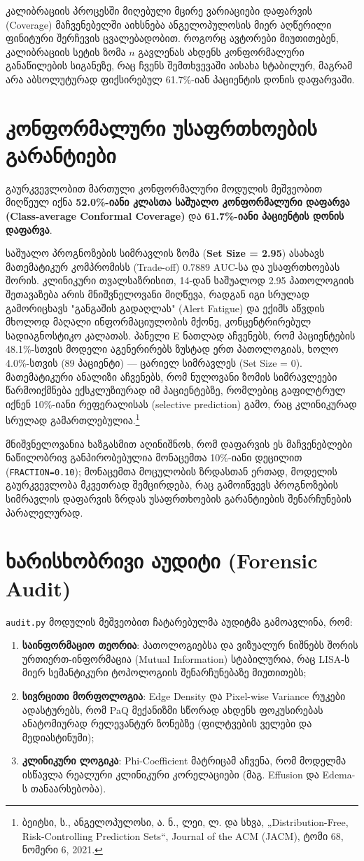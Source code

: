 \documentclass[12pt,a4paper,oneside]{report}
\begin{document}
კალიბრაციის პროცესში მიღებული მცირე ვარიაციები დაფარვის (Coverage) მაჩვენებელში აიხსნება ანგელოპულოსის მიერ აღწერილი ფინიტური შერჩევის ცვალებადობით. როგორც ავტორები მიუთითებენ, კალიბრაციის სეტის ზომა $n$ გავლენას ახდენს კონფორმალური განაწილების სიგანეზე, რაც ჩვენს შემთხვევაში აისახა სტაბილურ, მაგრამ არა აბსოლუტურად ფიქსირებულ 61.7\%-იან პაციენტის დონის დაფარვაში.

\section{კონფორმალური უსაფრთხოების გარანტიები}
გაურკვევლობით მართული კონფორმალური მოდულის მეშვეობით მიღწეულ იქნა \textbf{52.0\%-იანი კლასთა საშუალო კონფორმალური დაფარვა (Class-average Conformal Coverage)} და \textbf{61.7\%-იანი პაციენტის დონის დაფარვა}. 

საშუალო პროგნოზების სიმრავლის ზომა (\textbf{Set Size = 2.95}) ასახავს მათემატიკურ კომპრომისს (Trade-off) 0.7889 AUC-სა და უსაფრთხოებას შორის. კლინიკური თვალსაზრისით, 14-დან საშუალოდ 2.95 პათოლოგიის შეთავაზება არის მნიშვნელოვანი მიღწევა, რადგან იგი სრულად გამორიცხავს "განგაშის გადაღლას" (Alert Fatigue) და ექიმს აწვდის მხოლოდ მაღალი ინფორმაციულობის მქონე, კონცენტრირებულ სადიაგნოსტიკო კალათას. პანელი E ნათლად აჩვენებს, რომ პაციენტების 48.1\%-სთვის მოდელი აგენერირებს ზუსტად ერთ პათოლოგიას, ხოლო 4.0\%-სთვის (89 პაციენტი) — ცარიელ სიმრავლეს (Set Size = 0). მათემატიკური ანალიზი აჩვენებს, რომ ნულოვანი ზომის სიმრავლეები წარმოიქმნება ექსკლუზიურად იმ პაციენტებზე, რომლებიც გაფილტრულ იქნენ 10\%-იანი რეფერალისას (selective prediction) გამო, რაც კლინიკურად სრულად გამართლებულია.\footnote{ბეიტსი, ს., ანგელოპულოსი, ა. ნ., ლეი, ლ. და სხვა, „Distribution-Free, Risk-Controlling Prediction Sets“, Journal of the ACM (JACM), ტომი 68, ნომერი 6, 2021.}

მნიშვნელოვანია ხაზგასმით აღინიშნოს, რომ დაფარვის ეს მაჩვენებლები ნაწილობრივ განპირობებულია მონაცემთა 10\%-იანი დეცილით (\texttt{FRACTION=0.10}); მონაცემთა მოცულობის ზრდასთან ერთად, მოდელის გაურკვევლობა მკვეთრად შემცირდება, რაც გამოიწვევს პროგნოზების სიმრავლის დაფარვის ზრდას უსაფრთხოების გარანტიების შენარჩუნების პარალელურად.

\section{ხარისხობრივი აუდიტი (Forensic Audit)}
\texttt{audit.py} მოდულის მეშვეობით ჩატარებულმა აუდიტმა გამოავლინა, რომ:
\begin{enumerate}[leftmargin=1.6em]
    \item \textbf{საინფორმაციო თეორია}: პათოლოგიებსა და ვიზუალურ ნიშნებს შორის ურთიერთ-ინფორმაცია (Mutual Information) სტაბილურია, რაც LISA-ს მიერ სემანტიკური ტოპოლოგიის შენარჩუნებაზე მიუთითებს;
    \item \textbf{სივრცითი მორფოლოგია}: Edge Density და Pixel-wise Variance რუკები ადასტურებს, რომ PaQ მექანიზმი სწორად ახდენს ფოკუსირებას ანატომიურად რელევანტურ ზონებზე (ფილტვების ველები და მედიასტინუმი);
    \item \textbf{კლინიკური ლოგიკა}: Phi-Coefficient მატრიცამ აჩვენა, რომ მოდელმა ისწავლა რეალური კლინიკური კორელაციები (მაგ. Effusion და Edema-ს თანაარსებობა).
\end{enumerate}
\end{document}
